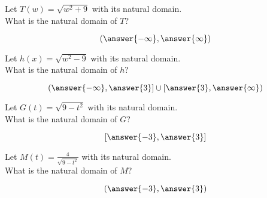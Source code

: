 \documentclass{ximera}
\author{Lee Wayand}
\begin{document}
\begin{exercise}








\begin{question}


Let $T(w) = \sqrt{w^2 + 9}$ with its natural domain. \\

What is the natural domain of $T$?

\[
\left( \answer{-\infty},  \answer{\infty}  \right)
\]


\end{question}







\begin{question}


Let $h(x) = \sqrt{w^2 - 9}$ with its natural domain. \\

What is the natural domain of $h$?

\[
\left( \answer{-\infty},  \answer{3} \right]   \cup \left[ \answer{3}, \answer{\infty}  \right)
\]


\end{question}








\begin{question}


Let $G(t) = \sqrt{9 - t^2}$ with its natural domain. \\

What is the natural domain of $G$?

\[
\left[  \answer{-3}, \answer{3}  \right]
\]


\end{question}








\begin{question}


Let $M(t) = \frac{4}{\sqrt{9 - t^2}}$ with its natural domain. \\

What is the natural domain of $M$?

\[
\left(  \answer{-3}, \answer{3}  \right)
\]


\end{question}













\end{exercise}
\end{document}
